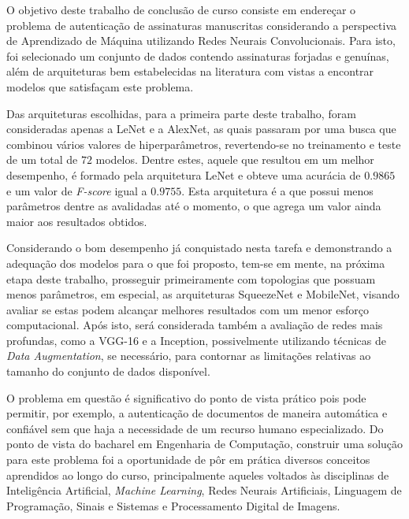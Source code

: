 
O objetivo deste trabalho de conclusão de curso consiste em endereçar o problema de autenticação de assinaturas manuscritas considerando a perspectiva de Aprendizado de Máquina utilizando Redes Neurais Convolucionais. Para isto, foi selecionado um conjunto de dados contendo assinaturas forjadas e genuínas, além de arquiteturas bem estabelecidas na literatura com vistas a encontrar modelos que satisfaçam este problema.

Das arquiteturas escolhidas, para a primeira parte deste trabalho, foram consideradas apenas a LeNet e a AlexNet, as quais passaram por uma busca que combinou vários valores de hiperparâmetros, revertendo-se no treinamento e teste de um total de $72$ modelos. Dentre estes, aquele que resultou em um melhor desempenho, é formado pela arquitetura LeNet e obteve uma acurácia de $0.9865$ e um valor de \emph{F-score} igual a $0.9755$. Esta arquitetura é a que possui menos parâmetros dentre as avalidadas até o momento, o que agrega um valor ainda maior aos resultados obtidos.


Considerando o bom desempenho já conquistado nesta tarefa e demonstrando a adequação dos modelos para o que foi proposto, tem-se em mente, na próxima etapa deste trabalho, prosseguir primeiramente com topologias que possuam menos parâmetros, em especial, as arquiteturas SqueezeNet e MobileNet, visando avaliar se estas podem alcançar melhores resultados com um menor esforço computacional. Após isto, será considerada também a avaliação de redes mais profundas, como a VGG-16 e a Inception, possivelmente utilizando técnicas de \emph{Data Augmentation}, se necessário, para contornar as limitações relativas ao tamanho do conjunto de dados disponível.

O problema em questão é significativo do ponto de vista prático pois pode permitir, por exemplo, a autenticação de documentos de maneira automática e confiável sem que haja a necessidade de um recurso humano especializado. Do ponto de vista do bacharel em Engenharia de Computação, construir uma solução para este problema foi a oportunidade de pôr em prática diversos conceitos aprendidos ao longo do curso, principalmente aqueles voltados às disciplinas de Inteligência Artificial, \emph{Machine Learning}, Redes Neurais Artificiais, Linguagem de Programação, Sinais e Sistemas e Processamento Digital de Imagens.
